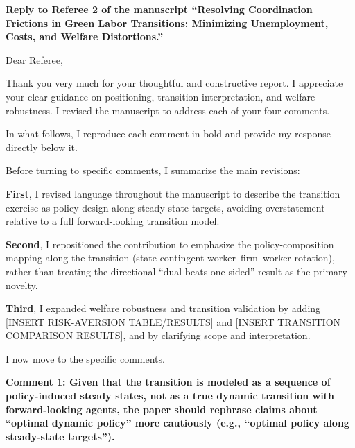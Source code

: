 \documentclass[12pt]{article}
\begin{document}
\theoremstyle{definition}
\newtheorem{definition}{Definition}
\theoremstyle{definition}
\newtheorem{result}{Result}
\theoremstyle{plain}
\newtheorem{lemma}{Lemma}
\theoremstyle{plain}
\newtheorem{proposition}{Proposition}
\theoremstyle{plain}
\newtheorem{theorem}{Theorem}
\theoremstyle{plain}
\newtheorem{corollary}{Corollary}

\begin{onehalfspacing}

\vspace{1.0cm}

\noindent \textbf{Reply to Referee 2 of the manuscript ``Resolving Coordination Frictions in Green Labor Transitions: Minimizing Unemployment, Costs, and Welfare Distortions.''}

\bigskip

Dear Referee,

\medskip

Thank you very much for your thoughtful and constructive report. I appreciate your clear guidance on positioning, transition interpretation, and welfare robustness. I revised the manuscript to address each of your four comments.

In what follows, I reproduce each comment in bold and provide my response directly below it.

Before turning to specific comments, I summarize the main revisions:

\textbf{First}, I revised language throughout the manuscript to describe the transition exercise as policy design along steady-state targets, avoiding overstatement relative to a full forward-looking transition model.

\textbf{Second}, I repositioned the contribution to emphasize the policy-composition mapping along the transition (state-contingent worker--firm--worker rotation), rather than treating the directional ``dual beats one-sided'' result as the primary novelty.

\textbf{Third}, I expanded welfare robustness and transition validation by adding [INSERT RISK-AVERSION TABLE/RESULTS] and [INSERT TRANSITION COMPARISON RESULTS], and by clarifying scope and interpretation.

I now move to the specific comments.

\bigskip
\bigskip

\textbf{Comment 1: Given that the transition is modeled as a sequence of policy-induced steady states, not as a true dynamic transition with forward-looking agents, the paper should rephrase claims about ``optimal dynamic policy'' more cautiously (e.g., ``optimal policy along steady-state targets'').}


\end{onehalfspacing}
\end{document}

